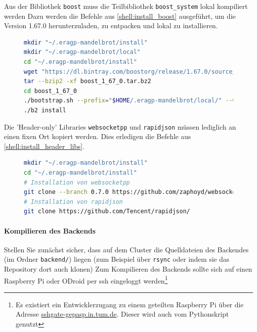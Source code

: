 Aus der Bibliothek \verb|boost| muss die Teilbibliothek \verb|boost_system| lokal kompiliert werden
Dazu werden die Befehle aus \autoref{shell:install_boost} ausgeführt,
um die Version 1.67.0 herunterzuladen, zu entpacken und lokal zu installieren.

\begin{figure}[h!]
	\begin{lstlisting}[language=bash, caption={Lokale Installation der Bibliothek boost.}, label={shell:install_boost}]
mkdir "~/.eragp-mandelbrot/install"
mkdir "~/.eragp-mandelbrot/local"
cd "~/.eragp-mandelbrot/install"
wget "https://dl.bintray.com/boostorg/release/1.67.0/source/boost_1_67_0.tar.bz2"
tar --bzip2 -xf boost_1_67_0.tar.bz2
cd boost_1_67_0
./bootstrap.sh --prefix="$HOME/.eragp-mandelbrot/local/" --with-libraries=system
./b2 install
    \end{lstlisting}
\end{figure}

Die 'Header-only' Libraries \verb|websocketpp| und \verb|rapidjson| müssen
lediglich an einen fixen Ort kopiert werden.
Dies erledigen die Befehle aus \autoref{shell:install_header_libs}.

\begin{figure}[h!]
	\begin{lstlisting}[language=bash, caption={Lokale Installation der Bibliotheken \texttt{websocketpp} und \texttt{rapidjson}.}, label={shell:install_header_libs}]
mkdir "~/.eragp-mandelbrot/install"
cd "~/.eragp-mandelbrot/install"
# Installation von websocketpp
git clone --branch 0.7.0 https://github.com/zaphoyd/websocketpp.git websocketpp --depth 1
# Installation von rapidjson
git clone https://github.com/Tencent/rapidjson/
    \end{lstlisting}
\end{figure}

\paragraph{Kompilieren des Backends}\label{par:himmuc_build_backend}

Stellen Sie zunächst sicher, dass auf dem Cluster die Quelldateien des Backendes (im Ordner \verb|backend/|) liegen
(zum Beispiel über \verb|rsync| oder indem sie das Repository dort auch klonen)
Zum Kompilieren des Backends sollte sich auf einen Raspberry Pi oder ODroid
per ssh eingeloggt werden\footnote{Es existiert ein Entwicklerzugang zu einem geteilten Raspberry Pi über die Adresse \url{sshgate-gepasp.in.tum.de}. Dieser wird auch vom Pythonskript genutzt}

